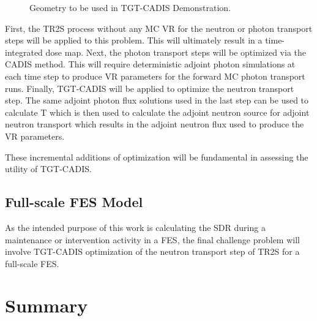 \begin{figure} \label{fig:mov_geom}
    \caption [Geometry for TGT-CADIS Demonstration]
	{Geometry to be used in TGT-CADIS Demonstration.}
\end{figure}

First, the TR2S process without any MC VR for the neutron or photon transport
steps will be applied to this problem.  This will ultimately result in a
time-integrated dose map.
Next, the photon transport steps will be optimized via the CADIS method.  This
will require deterministic adjoint photon simulations at each time step to
produce VR parameters for the forward MC photon transport runs.
Finally, TGT-CADIS will be applied to optimize the neutron transport step.  The
same adjoint photon flux solutions used in the last step can be used to
calculate T which is then used to calculate the adjoint neutron source for
adjoint neutron transport which results in the adjoint neutron flux used to
produce the VR parameters.

These incremental additions of optimization will be fundamental in assessing the
utility of TGT-CADIS. 






\subsection{Full-scale FES Model} \label{sec:full_scale}
As the intended purpose of this work is  
calculating the SDR during a maintenance or
intervention activity in a FES, the final challenge problem will involve 
TGT-CADIS optimization of the neutron transport step of TR2S for a full-scale
FES.

\section{Summary}\label{sec:summary}

